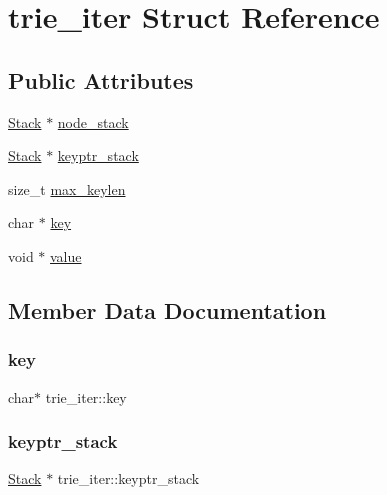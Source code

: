 \hypertarget{structtrie__iter}{}\section{trie\+\_\+iter Struct Reference}
\label{structtrie__iter}
\subsection*{Public Attributes}
\begin{DoxyCompactItemize}
\item 
\mbox{\hyperlink{stack_8h_aa7883e8bf747b9dedec990b539df2cc0}{Stack}} $\ast$ \mbox{\hyperlink{structtrie__iter_a64c95d56b672bb241db8e24c438e6f07}{node\+\_\+stack}}
\item 
\mbox{\hyperlink{stack_8h_aa7883e8bf747b9dedec990b539df2cc0}{Stack}} $\ast$ \mbox{\hyperlink{structtrie__iter_a8b8603e4a20fd83104e53a3735075826}{keyptr\+\_\+stack}}
\item 
size\+\_\+t \mbox{\hyperlink{structtrie__iter_add40401793ab6e342863b7747af165d1}{max\+\_\+keylen}}
\item 
char $\ast$ \mbox{\hyperlink{structtrie__iter_aec2838a9ba97957bb00a17e1dde0061a}{key}}
\item 
void $\ast$ \mbox{\hyperlink{structtrie__iter_a6b9dbd03ea4c0c5e909ab8608633fe1b}{value}}
\end{DoxyCompactItemize}


\subsection{Member Data Documentation}
\mbox{\label{structtrie__iter_aec2838a9ba97957bb00a17e1dde0061a}} 
\subsubsection{\texorpdfstring{key}{key}}
{\footnotesize\ttfamily char$\ast$ trie\+\_\+iter\+::key}

\mbox{\label{structtrie__iter_a8b8603e4a20fd83104e53a3735075826}} 
\subsubsection{\texorpdfstring{keyptr\_stack}{keyptr\_stack}}
{\footnotesize\ttfamily \mbox{\hyperlink{stack_8h_aa7883e8bf747b9dedec990b539df2cc0}{Stack}} $\ast$ trie\+\_\+iter\+::keyptr\+\_\+stack}

